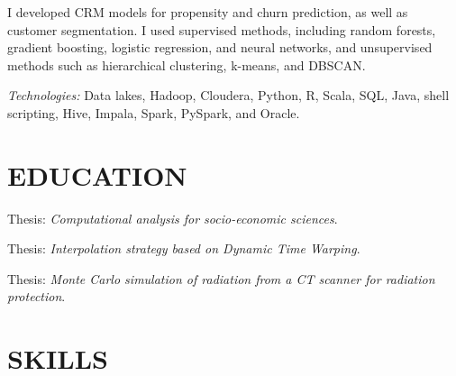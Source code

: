 \documentclass[11pt,a4paper,roman]{moderncv}        %
\begin{document}
I developed CRM models for propensity and churn prediction, as well as customer segmentation. I used supervised methods, including random forests, gradient boosting, logistic regression, and neural networks, and unsupervised methods such as hierarchical clustering, k-means, and DBSCAN.

\vspace{5pt}
\textit{Technologies:} Data lakes, Hadoop, Cloudera, Python, R, Scala, SQL, Java, shell scripting, Hive, Impala, Spark, PySpark, and Oracle.

\section{EDUCATION}

Thesis: \textit{Computational analysis for socio-economic sciences}.

\vspace{10pt}


\vspace{10pt}


\vspace{10pt}

Thesis: \textit{Interpolation strategy based on Dynamic Time Warping}.

\vspace{10pt}

Thesis: \textit{Monte Carlo simulation of radiation from a CT scanner for radiation protection}.

\section{SKILLS}
\end{document}
